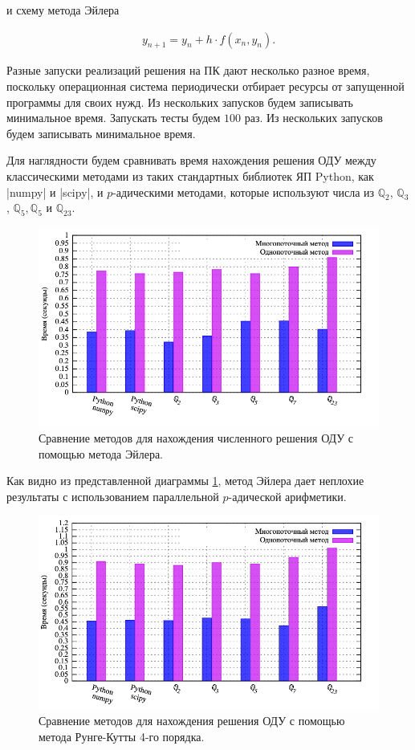 \documentclass[master, och, diploma, times]{sty/SCWorks}
\theoremstyle{plain}
\theoremstyle{definition}
\numberwithin{equation}{section}
\begin{document}
\noindent и схему метода Эйлера

\begin{equation}%
\begin{aligned}
y_{n+1}=y_n+h \cdot f(x_n, y_n).
\end{aligned}
\end{equation}


Разные запуски реализаций решения на ПК дают несколько разное время, поскольку операционная система периодически отбирает ресурсы от запущенной программы для своих нужд. Из нескольких запусков будем записывать минимальное время. Запускать тесты будем $100$ раз. Из нескольких запусков будем записывать минимальное время.

Для наглядности будем сравнивать время нахождения решения ОДУ между классическими методами из таких стандартных библиотек ЯП Python, как |numpy| и |scipy|, и $p$-адическими методами, которые используют числа из $\mathbb{Q}_2$, $\mathbb{Q}_3$, $\mathbb{Q}_5, \mathbb{Q}_5$ и $\mathbb{Q}_{23}$.

\begin{figure}[H]
\centerline{\includegraphics[width=0.85\linewidth]{../gnuplot/multi/euler/plot.png}}
\caption{Сравнение методов для нахождения численного решения ОДУ с помощью метода Эйлера.}
\label{img:multi:ode:euler}
\end{figure}


Как видно из представленной диаграммы \ref{img:multi:ode:euler}, метод Эйлера дает неплохие результаты с использованием параллельной $p$-адической арифметики.


\begin{figure}[H]
\centerline{\includegraphics[width=0.85\linewidth]{../gnuplot/multi/rk/plot.png}}
\caption{Сравнение методов для нахождения решения ОДУ с помощью метода Рунге-Кутты 4-го порядка.}
\label{img:comp:ode:rk}
\end{figure}
\end{document}
